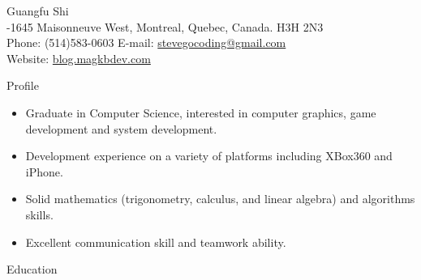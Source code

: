 \documentclass[10pt]{article}
\newenvironment{myitemize}{\begin{itemize} %
        \setlength{\itemsep}{0.25em} 
        \setlength{\topsep}{\itemsep} 
        \setlength{\labelsep}{1em}
        \setlength{\parskip}{0em}
        \setlength{\partopsep}{0em}
}%
{ \end{itemize} }
\begin{document}
 
\date{}
\newlength{\oldcvlabelwidth}
\newlength{\oldcvlabelsep}



\begin{cv} {{\large Guangfu Shi}\\
    { \normalsize {}-1645 Maisonneuve West, Montreal, Quebec, Canada. H3H 2N3 \\ 
    Phone: {\mdseries (514)583-0603}  
    \hfill E-mail: {\mdseries \href{mailto:stevegocoding@gmail.com} {stevegocoding@gmail.com}} \\
	Website: \url{blog.magkbdev.com}
    }
}


\setlength{\oldcvlabelwidth}{\cvlabelwidth}
\setlength{\oldcvlabelsep}{\cvlabelsep}
\setlength{\cvlabelwidth}{0.5em}

%

\begin{cvlist}{Profile} 
\item
    \begin{myitemize}
        \item Graduate in Computer Science, interested in computer graphics, game development and system development.
        \item Development experience on a variety of platforms including XBox360 and iPhone.
        \item Solid mathematics (trigonometry, calculus, and linear algebra) and algorithms skills. 
        \item Excellent communication skill and teamwork ability. 

    \end{myitemize}
\end{cvlist}


\setlength{\cvlabelwidth}{1em}

\begin{cvlist}{Education}
    

\end{cvlist}
\end{cv}
\end{document}
